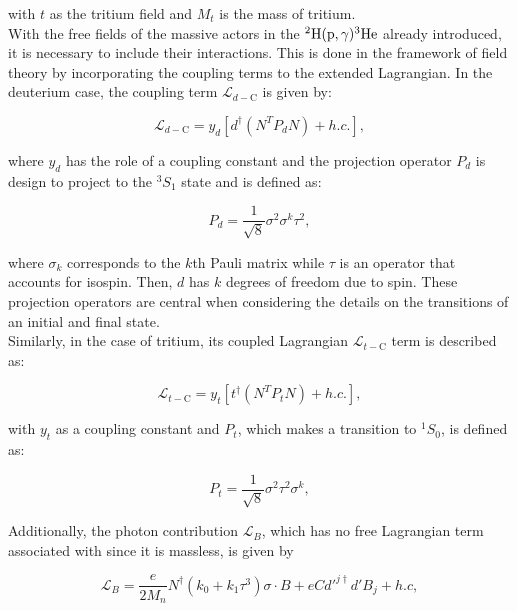 \documentclass[openany]{book}
\begin{document}
with $t$ as the tritium field and $M_t$ is the mass of tritium.\\

With the free fields of the massive actors in the $\mathrm{{}^{2}H(p, \gamma){}^{3}He}$ already introduced, it is necessary to include their interactions. This is done in the framework of field theory by incorporating the coupling terms to the extended Lagrangian. In the deuterium case, the coupling term $	\mathcal{L}_{d-\mathrm{C}}$ is given by:

 \begin{equation}\label{eq:micro_EFT_lagrangian_d_coupling}
	\mathcal{L}_{d-\mathrm{C}}  = y_d [d^{\dagger} (N^{T} P_d N) + h.c.],
\end{equation}

where $y_d$ has the role of a coupling constant and the projection operator $P_d$ is design to project to the ${}^{3}S_1$ state and is defined as: 

\begin{equation}\label{eq:micro_EFT_Pd}
	P_d = \frac{1}{\sqrt{8}} \sigma^2 \sigma^k \tau^2,
 \end{equation}

where $\sigma_k$ corresponds to the $k$th Pauli matrix while $\tau$ is an operator that accounts for isospin. Then, $d$ has $k$ degrees of freedom due to spin. These projection operators are central when considering the details on the transitions of an initial and final state. \\

Similarly, in the case of tritium, its coupled Lagrangian $\mathcal{L}_{t-\mathrm{C}}$ term is described as: 

\begin{equation}\label{eq:micro_EFT_lagrangian_t_coupling}
	\mathcal{L}_{t-\mathrm{C}}  = y_t [t^{\dagger} (N^{T} P_t N) + h.c.],
\end{equation}

with $y_t$ as a coupling constant and $P_t$, which makes a transition to $^{1}S_0$, is defined as: 

\begin{equation}\label{eq:micro_EFT_Pt}
	P_t = \frac{1}{\sqrt{8}} \sigma^2 \tau^2 \sigma^k,
\end{equation}

Additionally, the photon contribution $\mathcal{L}_B$, which has no free Lagrangian term associated with since it is massless,  is given by 

\begin{equation}\label{eq:micro_EFT_lagrangian_B}
	\mathcal{L}_B = \frac{e}{2M_n} N^\dagger (k_0 + k_1 \tau^3) \sigma \cdot B + e C d'^{j\dagger}  d' B_j + h.c,
\end{equation}
\end{document}
